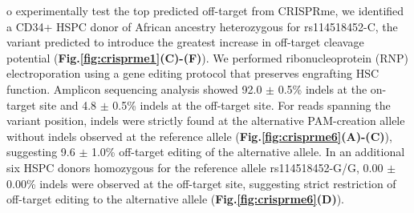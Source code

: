 \documentclass[a4paper, titlepage, openright]{book}
\begin{document}
o experimentally test the top predicted off-target from CRISPRme, we identified a CD34+ HSPC donor of African ancestry heterozygous for rs114518452-C, the variant predicted to introduce the greatest increase in off-target cleavage potential (\textbf{Fig.\ref{fig:crisprme1}(C)-(F)}).  We performed ribonucleoprotein (RNP) electroporation using a gene editing protocol that preserves engrafting HSC function. Amplicon sequencing analysis showed 92.0 $\pm$ 0.5\% indels at the on-target site and 4.8 $\pm$ 0.5\% indels at the off-target site. For reads spanning the variant position, indels were strictly found at the alternative PAM-creation allele without indels observed at the reference allele (\textbf{Fig.\ref{fig:crisprme6}(A)-(C)}),  suggesting 9.6 $\pm$ 1.0\% off-target editing of the alternative allele. In an additional six HSPC donors homozygous for the reference allele rs114518452-G/G, 0.00 $\pm$ 0.00\% indels were observed at the off-target site, suggesting strict restriction of off-target editing to the alternative allele (\textbf{Fig.\ref{fig:crisprme6}(D)}).
\end{document}
